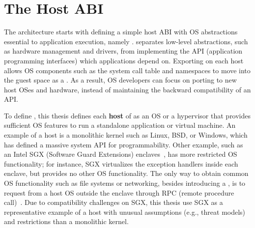 \section{The Host ABI}
\label{sec:overview:host}

The \graphene{} architecture starts with defining a simple host ABI with
OS abstractions essential to application execution,
namely \thehostabi{}.
\thehostabi{} separates
low-level abstractions, such as hardware management and drivers,
from implementing the API (application programming interfaces) which applications depend on.
Exporting \thehostabi{} on each host allows OS components
such as the system call table
and namespaces to move into the guest space as a \libos{}.
As a result,
OS developers can focus on porting \thehostabi{}
to new host OSes and hardware,
instead of maintaining the backward compatibility of an API.









 
To define \thehostabi{},
this thesis defines
each {\bf host} of \thehostabi{}
as an OS or a hypervisor
that provides sufficient OS features to run a standalone application
or virtual machine.
An example of a host is a monolithic kernel
such as Linux, BSD, or Windows,
which has defined a massive system API for programmability.
Other example,
such as an Intel SGX (Software Guard Extensions) enclaves~\cite{intelsgx},
has more restricted OS functionality;
for instance, SGX virtualizes the exception handlers
inside each enclave, but provides no other OS functionality. The only way to obtain common OS functionality such as file systems or networking,
besides introducing a \libos{},
is to request from a host OS outside the enclave
through RPC (remote procedure call)~\cite{checkoway13iago,osdi16scone}.
Due to compatibility challenges
on SGX, this thesis use SGX as a representative example of a host
with unusual assumptions (e.g., threat models) and restrictions
than a monolithic kernel.

